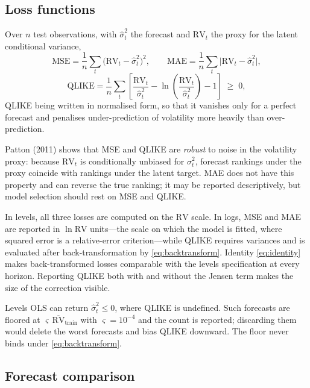 \documentclass[11pt,a4paper]{article}
\newcommand{\RV}{\mathrm{RV}}
\newcommand{\MSE}{\mathrm{MSE}}
\newcommand{\MAE}{\mathrm{MAE}}
\newcommand{\QLIKE}{\mathrm{QLIKE}}
\begin{document}
\subsection{Loss functions}

Over $n$ test observations, with $\hat\sigma^{2}_t$ the forecast and $\RV_t$ the proxy for
the latent conditional variance,
\begin{equation}
  \MSE=\frac{1}{n}\sum_t\bigl(\RV_t-\hat\sigma^{2}_t\bigr)^{2},
  \qquad
  \MAE=\frac{1}{n}\sum_t\bigl|\RV_t-\hat\sigma^{2}_t\bigr|,
  \label{eq:mse-mae}
\end{equation}
\begin{equation}
  \QLIKE=\frac{1}{n}\sum_t\left[\frac{\RV_t}{\hat\sigma^{2}_t}
  -\ln\!\left(\frac{\RV_t}{\hat\sigma^{2}_t}\right)-1\right]\;\ge\;0,
  \label{eq:qlike}
\end{equation}
QLIKE being written in normalised form, so that it vanishes only for a perfect forecast and
penalises under-prediction of volatility more heavily than over-prediction.

Patton (2011) shows that MSE and QLIKE are \emph{robust} to noise in the volatility proxy:
because $\RV_t$ is conditionally unbiased for $\sigma^{2}_t$, forecast rankings under the
proxy coincide with rankings under the latent target. MAE does not have this property and
can reverse the true ranking; it may be reported descriptively, but model selection should
rest on MSE and QLIKE.

In levels, all three losses are computed on the $\RV$ scale. In logs, MSE and MAE are
reported in $\ln \RV$ units---the scale on which the model is fitted, where squared error is
a relative-error criterion---while QLIKE requires variances and is evaluated after
back-transformation by \eqref{eq:backtransform}. Identity \eqref{eq:identity} makes
back-transformed losses comparable with the levels specification at every horizon. Reporting
QLIKE both with and without the Jensen term makes the size of the correction visible.

Levels OLS can return $\hat\sigma^{2}_t\le 0$, where QLIKE is undefined. Such forecasts are
floored at $\varsigma\,\overline{\RV}_{\text{train}}$ with $\varsigma=10^{-4}$ and the count
is reported; discarding them would delete the worst forecasts and bias QLIKE downward. The
floor never binds under \eqref{eq:backtransform}.

\subsection{Forecast comparison}
\end{document}
